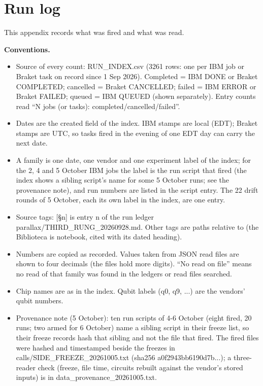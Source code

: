 \documentclass[11pt]{article}
\begin{document}
\appendix\section{Run log}
This appendix records what was fired and what was read.

\textbf{Conventions.}

\begin{itemize}
\item Source of every count: RUN\_INDEX.csv (3261 rows: one per IBM job or Braket task on record since 1 Sep 2026). Completed = IBM DONE or Braket COMPLETED; cancelled = Braket CANCELLED; failed = IBM ERROR or Braket FAILED; queued = IBM QUEUED (shown separately). Entry counts read ``N jobs (or tasks): completed/cancelled/failed''.
\item Dates are the created field of the index. IBM stamps are local (EDT); Braket stamps are UTC, so tasks fired in the evening of one EDT day can carry the next date.
\item A family is one date, one vendor and one experiment label of the index; for the 2, 4 and 5 October IBM jobs the label is the run script that fired (the index shows a sibling script's name for some 5 October runs; see the provenance note), and run numbers are listed in the script entry. The 22 drift rounds of 5 October, each its own label in the index, are one entry.
\item Source tags: {[}\S{}n{]} is entry n of the run ledger parallax/THIRD\_RUNG\_20260928.md. Other tags are paths relative to  (the Biblioteca is notebook, cited with its dated heading).
\item Numbers are copied as recorded. Values taken from JSON read files are shown to four decimals (the files hold more digits). ``No read on file'' means no read of that family was found in the ledgers or read files searched.
\item Chip names are as in the index. Qubit labels (q0, q9, ...) are the vendors' qubit numbers.
\item Provenance note (5 October): ten run scripts of 4-6 October (eight fired, 20 runs; two armed for 6 October) name a sibling script in their freeze list, so their freeze records hash that sibling and not the file that fired. The fired files were hashed and timestamped beside the freezes in calls/SIDE\_FREEZE\_20261005.txt (sha256 a0f2943bb6190d7b...); a three-reader check (freeze, file time, circuits rebuilt against the vendor's stored inputs) is in data\_provenance\_20261005.txt.
\end{itemize}
\end{document}
